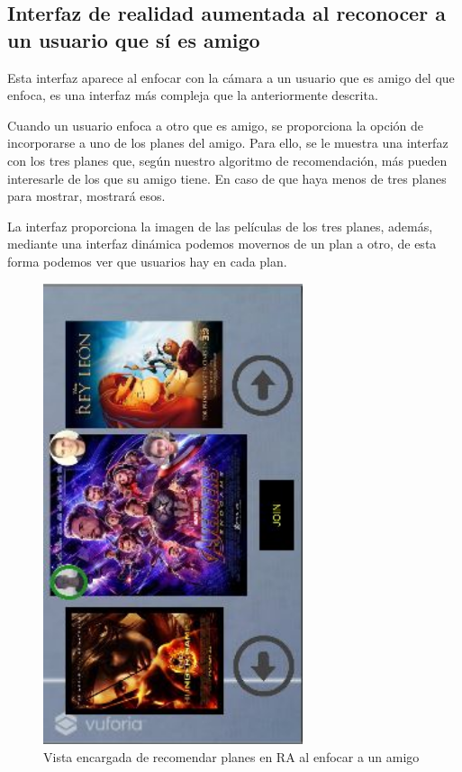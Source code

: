 \subsection{Interfaz de realidad aumentada al reconocer a un usuario que sí es amigo}
\label{makereference3.4.5.2}
Esta interfaz aparece al enfocar con la cámara a un usuario que es amigo del que enfoca, 
es una interfaz más compleja que la anteriormente descrita.

Cuando un usuario enfoca a otro que es amigo, se proporciona la opción de incorporarse a uno de los planes del
 amigo. Para ello, se le muestra una interfaz con los tres planes que, según nuestro algoritmo de recomendación,
  más pueden interesarle de los que su amigo tiene. En caso de que haya menos de tres planes para mostrar, mostrará esos.

La interfaz proporciona la imagen de las películas de los tres planes, además, mediante una interfaz dinámica 
podemos movernos de un plan a otro, de esta forma podemos ver que usuarios hay en cada plan.

\begin{figure}[H]
        \centering
        \includegraphics[width=3in, angle=270]{figures/chapter-2/CapturaRecomendador.JPG}
        \caption{Vista encargada de recomendar planes en RA al enfocar a un amigo}
        \label{fig:ra_recomendacion}
\end{figure}

